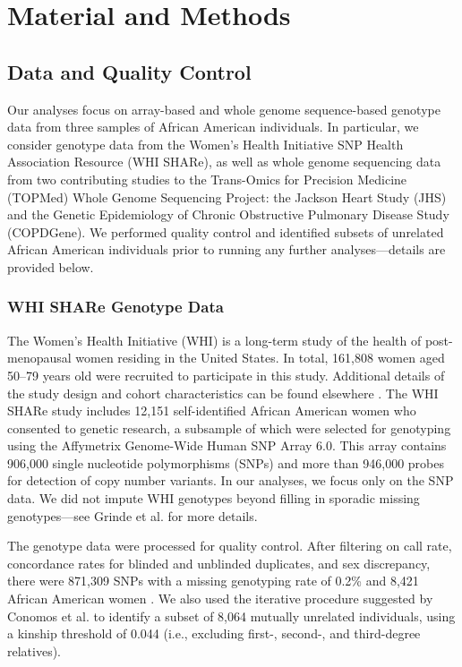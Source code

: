 \documentclass[12pt]{article}
\begin{document}
\section{Material and Methods}


\subsection{Data and Quality Control}

Our analyses focus on array-based and whole genome sequence-based genotype data from three samples of African American individuals.
In particular, we consider genotype data from the Women's Health Initiative SNP Health Association Resource (WHI SHARe), as well as whole genome sequencing data from two contributing studies to the Trans-Omics for Precision Medicine (TOPMed) Whole Genome Sequencing Project: the Jackson Heart Study (JHS) and the Genetic Epidemiology of Chronic Obstructive Pulmonary Disease Study (COPDGene).
We performed quality control and identified subsets of unrelated African American individuals prior to running any further analyses---details are provided below.

\subsubsection{WHI SHARe Genotype Data}

The Women's Health Initiative (WHI) is a long-term study of the health of post-menopausal women residing in the United States.
In total, 161,808 women aged 50--79 years old were recruited to participate in this study.
Additional details of the study design and cohort characteristics can be found elsewhere \cite{whi}.
The WHI SHARe study includes 12,151 self-identified African American women who consented to genetic research, a subsample of which were selected for genotyping using the Affymetrix Genome-Wide Human SNP Array 6.0.
This array contains 906,000 single nucleotide polymorphisms (SNPs) and more than 946,000 probes for detection of copy number variants. 
In our analyses, we focus only on the SNP data. 
We did not impute WHI genotypes beyond filling in sporadic missing genotypes---see Grinde et al. \cite{steam} for more details.

The genotype data were processed for quality control.
After filtering on call rate, concordance rates for blinded and unblinded duplicates, and sex discrepancy, there were 871,309 SNPs with a missing genotyping rate of 0.2\% and 8,421 African American women \cite{reiner2012}.
We also used the iterative procedure suggested by Conomos et al. \cite{conomos2016related} to identify a subset of 8,064 mutually unrelated individuals, using a kinship threshold of 0.044 (i.e., excluding first-, second-, and third-degree relatives).
\end{document}
